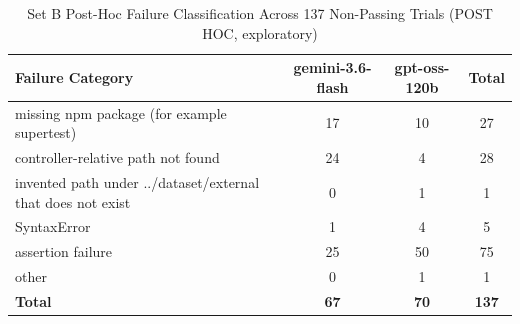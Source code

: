\begin{table}[htbp]
\centering
\caption{Set B Post-Hoc Failure Classification Across 137 Non-Passing Trials (POST HOC, exploratory)}
\label{tab:setb_failures}
\begin{tabular}{lccc}
\toprule
\textbf{Failure Category} & \textbf{gemini-3.6-flash} & \textbf{gpt-oss-120b} & \textbf{Total} \\
\midrule
missing npm package (for example supertest) & 17 & 10 & 27 \\
controller-relative path not found & 24 & 4 & 28 \\
invented path under ../dataset/external that does not exist & 0 & 1 & 1 \\
SyntaxError & 1 & 4 & 5 \\
assertion failure & 25 & 50 & 75 \\
other & 0 & 1 & 1 \\
\midrule
\textbf{Total} & \textbf{67} & \textbf{70} & \textbf{137} \\
\bottomrule
\end{tabular}
\end{table}
